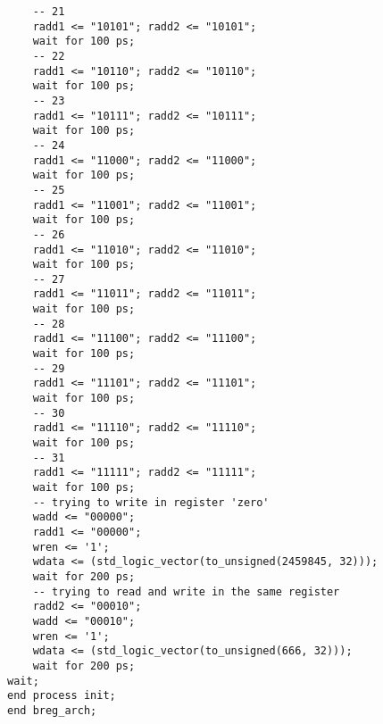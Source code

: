 \documentclass[a4paper]{article}
\begin{document}
\begin{lstlisting}
    -- 21
    radd1 <= "10101"; radd2 <= "10101";
    wait for 100 ps;
    -- 22
    radd1 <= "10110"; radd2 <= "10110";
    wait for 100 ps;
    -- 23
    radd1 <= "10111"; radd2 <= "10111";
    wait for 100 ps;
    -- 24
    radd1 <= "11000"; radd2 <= "11000";
    wait for 100 ps;
    -- 25
    radd1 <= "11001"; radd2 <= "11001";
    wait for 100 ps;
    -- 26
    radd1 <= "11010"; radd2 <= "11010";
    wait for 100 ps;
    -- 27
    radd1 <= "11011"; radd2 <= "11011";
    wait for 100 ps;
    -- 28
    radd1 <= "11100"; radd2 <= "11100";
    wait for 100 ps;
    -- 29
    radd1 <= "11101"; radd2 <= "11101";
    wait for 100 ps;
    -- 30
    radd1 <= "11110"; radd2 <= "11110";
    wait for 100 ps;
    -- 31
    radd1 <= "11111"; radd2 <= "11111";
    wait for 100 ps;
    -- trying to write in register 'zero'
    wadd <= "00000"; 
    radd1 <= "00000"; 
    wren <= '1'; 
    wdata <= (std_logic_vector(to_unsigned(2459845, 32)));
    wait for 200 ps;
    -- trying to read and write in the same register
    radd2 <= "00010";
    wadd <= "00010"; 
    wren <= '1'; 
    wdata <= (std_logic_vector(to_unsigned(666, 32)));
    wait for 200 ps;
wait;
end process init;
end breg_arch;

\end{lstlisting}
\end{document}
